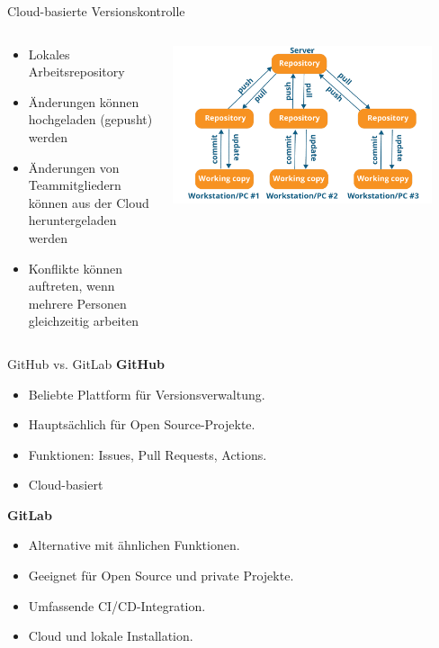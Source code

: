 \documentclass[compress,aspectratio=169]{beamer}
\begin{document}
	\begin{frame}{Cloud-basierte Versionskontrolle}
		\begin{columns}
			\begin{column}{0.6\textwidth}
				\begin{itemize}
						\item Lokales Arbeitsrepository
						\item Änderungen können hochgeladen (gepusht) werden
						\item Änderungen von Teammitgliedern können aus der Cloud heruntergeladen werden
						\item Konflikte können auftreten, wenn mehrere Personen gleichzeitig arbeiten
				\end{itemize}
			\end{column}
			\begin{column}{0.4\textwidth}
				\begin{center}
					\includegraphics[width=0.9\textwidth]{assets/version-control.png}
				\end{center}
			\end{column}
		\end{columns}
	\end{frame}
	
	\begin{frame}{GitHub vs. GitLab}
		\textbf{GitHub}
		\begin{itemize}
			\item Beliebte Plattform für Versionsverwaltung.
			\item Hauptsächlich für Open Source-Projekte.
			\item Funktionen: Issues, Pull Requests, Actions.
			\item Cloud-basiert
		\end{itemize}
		\vspace{1em}
		\textbf{GitLab}
		\begin{itemize}
			\item Alternative mit ähnlichen Funktionen.
			\item Geeignet für Open Source und private Projekte.
			\item Umfassende CI/CD-Integration.
			\item Cloud und lokale Installation.
		\end{itemize}
	\end{frame}			
		
\end{document}
